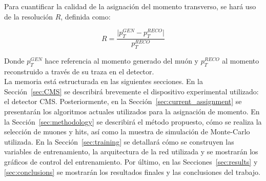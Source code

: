 Para cuantificar la calidad de la asignaci\'on del momento transverso, se har\'a uso de la resoluci\'on $R$, definida como:

\begin{equation}
  R = \dfrac{\lvert p_{T}^{GEN} - p_{T}^{RECO}\rvert}{p_{T}^{RECO}}
\label{eq:R}
\end{equation}

Donde $p_{T}^{GEN}$ hace referencia al momento generado del mu\'on y $p_{T}^{RECO}$ al momento reconstruido a trav\'es de su traza en el detector. \\

La memoria est\'a estructurada en las siguientes secciones. En la Secci\'on~\ref{sec:CMS} se describir\'a brevemente el dispositivo experimental utilizado: el detector CMS. Posteriormente, en la Secci\'on~\ref{sec:current_assignment} se presentar\'an los algoritmos actuales utilizados para la asignaci\'on de momento. En la Secci\'on~\ref{sec:methodology} se describir\'a el m\'etodo propuesto, c\'omo se realiza la selecci\'on de muones y hits, as\'i como la muestra de simulaci\'on de Monte-Carlo utilizada. En la Secci\'on~\ref{sec:training} se detallar\'a c\'omo se construyen las variables de entrenamiento, la arquitectura de la red utilizada y se mostrar\'an los gr\'aficos de control del entrenamiento. Por \'ultimo, en las Secciones~\ref{sec:results} y \ref{sec:conclusions} se mostrar\'an los resultados finales y las conclusiones del trabajo.

